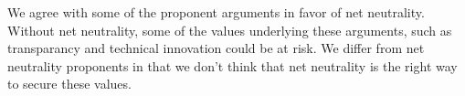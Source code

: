 We agree with some of the proponent arguments in favor of net neutrality. Without net neutrality, some of the values underlying these arguments, such as transparancy and technical innovation could be at risk. We differ from net neutrality proponents in that we don't think that net neutrality is the right way to secure these values.